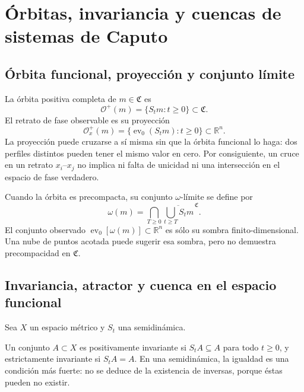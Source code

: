 \fi

\ifnum{}\relax
\ifdefined\HAFOCaputoBlockSelect
\section{Órbitas, invariancia y cuencas de sistemas de Caputo}
\fi
\subsection{Órbita funcional, proyección y conjunto límite}

La órbita positiva completa de \(m\in\mathfrak C\) es
\begin{equation}
 \mathcal O^+(m)=\{S_tm:t\geq0\}\subset\mathfrak C.
 \label{eq:geofo-functional-orbit}
\end{equation}
El retrato de fase observable es su proyección
\begin{equation}
 \mathcal O_x^+(m)=
 \{\operatorname{ev}_0(S_tm):t\geq0\}\subset\mathbb R^n.
 \label{eq:geofo-projected-orbit}
\end{equation}
La proyección puede cruzarse a sí misma sin que la órbita funcional lo haga:
dos perfiles distintos pueden tener el mismo valor en cero. Por consiguiente,
un cruce en un retrato \(x_i\)--\(x_j\) no implica ni falta de unicidad ni una
intersección en el espacio de fase verdadero.

Cuando la órbita es precompacta, su conjunto \(\omega\)-límite se define por
\begin{equation}
 \omega(m)=\bigcap_{T\geq0}
 \overline{\bigcup_{t\geq T}S_tm}^{\,\mathfrak C}.
 \label{eq:geofo-omega-limit}
\end{equation}
El conjunto observado
\(\operatorname{ev}_0[\omega(m)]\subset\mathbb R^n\) es sólo su sombra
finito-dimensional. Una nube de puntos acotada puede sugerir esa sombra, pero
no demuestra precompacidad en \(\mathfrak C\).

\subsection{Invariancia, atractor y cuenca en el espacio funcional}

Sea \(X\) un espacio métrico y \(S_t\) una semidinámica.

\begin{definition}[invariancia]
Un conjunto \(A\subset X\) es positivamente invariante si
\(S_tA\subseteq A\) para todo \(t\geq0\), y estrictamente invariante si
\(S_tA=A\). En una semidinámica, la igualdad es una condición más fuerte: no
se deduce de la existencia de inversas, porque éstas pueden no existir.
\end{definition}

